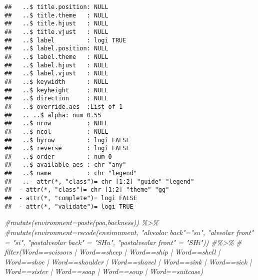 \documentclass[
]{article}
\newenvironment{Shaded}{\begin{snugshade}}{\end{snugshade}}
\newcommand{\CommentTok}[1]{\textcolor[rgb]{0.56,0.35,0.01}{\textit{#1}}}
\begin{document}
\begin{verbatim}
##   ..$ title.position: NULL
##   ..$ title.theme   : NULL
##   ..$ title.hjust   : NULL
##   ..$ title.vjust   : NULL
##   ..$ label         : logi TRUE
##   ..$ label.position: NULL
##   ..$ label.theme   : NULL
##   ..$ label.hjust   : NULL
##   ..$ label.vjust   : NULL
##   ..$ keywidth      : NULL
##   ..$ keyheight     : NULL
##   ..$ direction     : NULL
##   ..$ override.aes  :List of 1
##   .. ..$ alpha: num 0.55
##   ..$ nrow          : NULL
##   ..$ ncol          : NULL
##   ..$ byrow         : logi FALSE
##   ..$ reverse       : logi FALSE
##   ..$ order         : num 0
##   ..$ available_aes : chr "any"
##   ..$ name          : chr "legend"
##   ..- attr(*, "class")= chr [1:2] "guide" "legend"
##  - attr(*, "class")= chr [1:2] "theme" "gg"
##  - attr(*, "complete")= logi FALSE
##  - attr(*, "validate")= logi TRUE
\end{verbatim}

\begin{Shaded}
\begin{Highlighting}[]
  \CommentTok{\#mutate(environment=paste(poa,backness)) \%\textgreater{}\%}
  \CommentTok{\#mutate(environment=recode(environment, "alveolar back"="su", "alveolar front" = "si", "postalveolar back" = "SHu", "postalveolar front" = "SHi")) \#\%\textgreater{}\%}
 \CommentTok{\# filter(Word==\textquotesingle{}scissors\textquotesingle{} | Word==\textquotesingle{}sheep\textquotesingle{} | Word==\textquotesingle{}ship\textquotesingle{} | Word==\textquotesingle{}shell\textquotesingle{} | Word==\textquotesingle{}shoe\textquotesingle{} | Word==\textquotesingle{}shoulder\textquotesingle{} | Word==\textquotesingle{}shovel\textquotesingle{} | Word==\textquotesingle{}sink\textquotesingle{} | Word==\textquotesingle{}sick\textquotesingle{} | Word==\textquotesingle{}sister\textquotesingle{} | Word==\textquotesingle{}soap\textquotesingle{} | Word==\textquotesingle{}soup\textquotesingle{} | Word==\textquotesingle{}suitcase\textquotesingle{})}
\end{Highlighting}
\end{Shaded}
\end{document}
